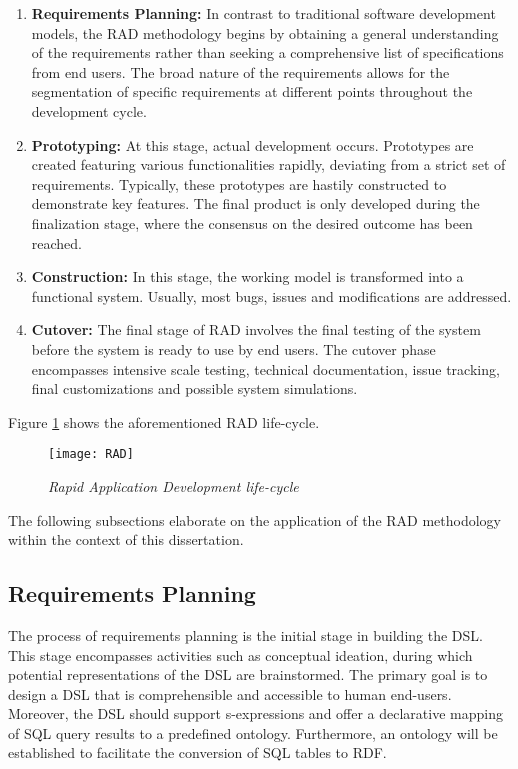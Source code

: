 \begin{enumerate}
\item \textbf{Requirements Planning:} In contrast to traditional software development models, the RAD methodology begins by obtaining a general understanding of the requirements rather than seeking a comprehensive list of specifications from end users.  The broad nature of the requirements allows for the segmentation of specific requirements at different points throughout the development cycle.

\item \textbf{Prototyping:} At this stage, actual development occurs.  Prototypes are created featuring various functionalities rapidly, deviating from a strict set of requirements.  Typically, these prototypes are hastily constructed to demonstrate key features.  The final product is only developed during the finalization stage, where the consensus on the desired outcome has been reached.

\item \textbf{Construction:}  In this stage, the working model is transformed into a functional system.  Usually, most bugs, issues and modifications are addressed.

\item \textbf{Cutover:} The final stage of RAD involves the final testing of the system before the system is ready to use by end users.  The cutover phase encompasses intensive scale testing, technical documentation, issue tracking, final customizations and possible system simulations.
\end{enumerate}

Figure \ref{fig:rad-lifecycle} shows the aforementioned RAD life-cycle.

\begin{figure}[H]
  \centering
  \texttt{[image: RAD]}
  \caption{\textit{Rapid Application Development life-cycle}}
  \label{fig:rad-lifecycle}
  \centering
\end{figure}

The following subsections elaborate on the application of the RAD methodology within the context of this dissertation.

\subsection{Requirements Planning}

The process of requirements planning is the initial stage in building the DSL.  This stage encompasses activities such as conceptual ideation, during which potential representations of the DSL are brainstormed.  The primary goal is to design a DSL that is comprehensible and accessible to human end-users.  Moreover, the DSL should support s-expressions and offer a declarative mapping of SQL query results to a predefined ontology.  Furthermore, an ontology will be established to facilitate the conversion of SQL tables to RDF.

